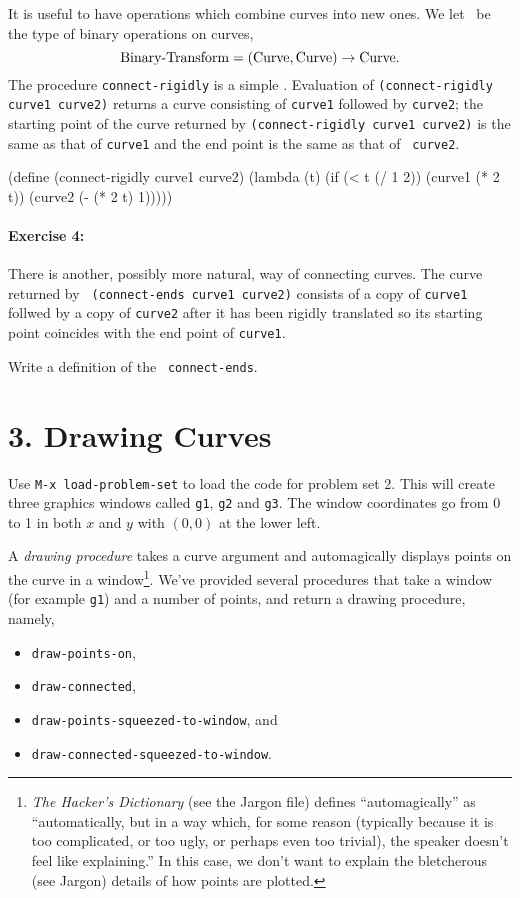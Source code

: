 It is useful to have operations which combine curves into new ones.  We
let \BT\ be the type of binary operations on curves, \[\mbox{Binary-Transform} =
(\mbox{Curve},\mbox{Curve})\rightarrow \mbox{Curve}.\] The procedure {\tt connect-rigidly} is a simple
\BT.  Evaluation of {\tt (connect-rigidly curve1 curve2)} returns a curve
consisting of {\tt curve1} followed by {\tt curve2}; the starting point of
the curve returned by {\tt (connect-rigidly curve1 curve2)} is the same as
that of {\tt curve1} and the end point is the same as that of {\tt
curve2}.

\beginlisp
(define (connect-rigidly curve1 curve2)
  (lambda (t)
    (if (< t (/ 1 2))
        (curve1 (* 2 t))
        (curve2 (- (* 2 t) 1)))))
\endlisp

\paragraph{Exercise 4:} There is another, possibly more
natural, way of connecting curves.  The curve returned by {\tt
(connect-ends curve1 curve2)} consists of a copy of {\tt curve1}
follwed by a copy of {\tt curve2} after it has been rigidly translated
so its starting point coincides with the end point of {\tt curve1}.

Write a definition of the \BT\ {\tt connect-ends}.

\section{3. Drawing Curves}

Use {\tt M-x load-problem-set} to load the code for problem set 2.  This
will create three graphics windows called {\tt g1}, {\tt g2} and {\tt g3}.
The window coordinates go from 0 to 1 in both $x$ and $y$ with $(0,0)$ at
the lower left.

A {\em drawing procedure} takes a curve argument and automagically
displays points on the curve in a window\footnote{{\em The Hacker's
Dictionary} (see the Jargon file) defines ``automagically'' as
``automatically, but in a way which, for some reason (typically because it
is too complicated, or too ugly, or perhaps even too trivial), the speaker
doesn't feel like explaining.''  In this case, we don't want to explain
the bletcherous (see Jargon) details of how points are plotted.}.  We've
provided several procedures that take a window (for example {\tt g1}) and
a number of points, and return a drawing procedure, namely,
\begin{itemize}
\item {\tt draw-points-on},
\item {\tt draw-connected},
\item {\tt draw-points-squeezed-to-window}, and
\item {\tt draw-connected-squeezed-to-window}.
\end{itemize}

